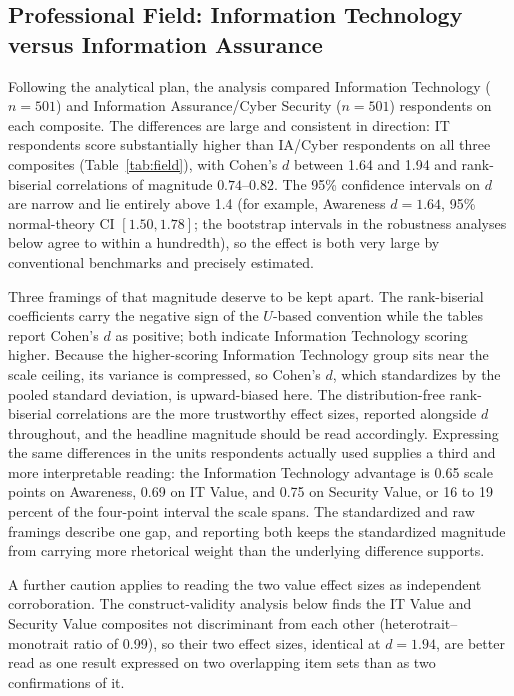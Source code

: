 \subsection{Professional Field: Information Technology versus Information Assurance}

Following the analytical plan, the analysis compared Information Technology ($n=501$) and Information Assurance/Cyber Security ($n=501$) respondents on each composite. The differences are large and consistent in direction: IT respondents score substantially higher than IA/Cyber respondents on all three composites (Table~\ref{tab:field}), with Cohen's $d$ between 1.64 and 1.94 and rank-biserial correlations of magnitude $0.74$--$0.82$. The 95\% confidence intervals on $d$ are narrow and lie entirely above 1.4 (for example, Awareness $d=1.64$, 95\% normal-theory CI $[1.50,1.78]$; the bootstrap intervals in the robustness analyses below agree to within a hundredth), so the effect is both very large by conventional benchmarks and precisely estimated.

Three framings of that magnitude deserve to be kept apart. The rank-biserial coefficients carry the negative sign of the $U$-based convention while the tables report Cohen's $d$ as positive; both indicate Information Technology scoring higher. Because the higher-scoring Information Technology group sits near the scale ceiling, its variance is compressed, so Cohen's $d$, which standardizes by the pooled standard deviation, is upward-biased here. The distribution-free rank-biserial correlations are the more trustworthy effect sizes, reported alongside $d$ throughout, and the headline magnitude should be read accordingly. Expressing the same differences in the units respondents actually used supplies a third and more interpretable reading: the Information Technology advantage is 0.65 scale points on Awareness, 0.69 on IT Value, and 0.75 on Security Value, or 16 to 19 percent of the four-point interval the scale spans. The standardized and raw framings describe one gap, and reporting both keeps the standardized magnitude from carrying more rhetorical weight than the underlying difference supports.

A further caution applies to reading the two value effect sizes as independent corroboration. The construct-validity analysis below finds the IT Value and Security Value composites not discriminant from each other (heterotrait--monotrait ratio of 0.99), so their two effect sizes, identical at $d=1.94$, are better read as one result expressed on two overlapping item sets than as two confirmations of it.

